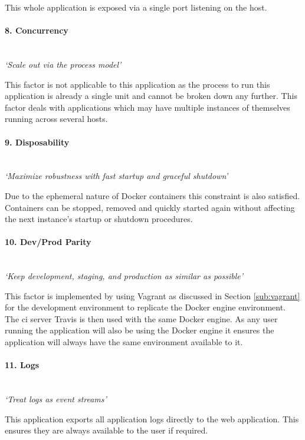 This whole application is exposed via a single port listening on the host.

\paragraph{8. Concurrency}\mbox{}\\
\textit{`Scale out via the process model'}

This factor is not applicable to this application as the process to run this application is already a single unit and cannot be broken down any further. This factor deals with applications which may have multiple instances of themselves running across several hosts.

\paragraph{9. Disposability}\mbox{}\\
\textit{`Maximize robustness with fast startup and graceful shutdown'}

Due to the ephemeral nature of \gls{Docker container}s this constraint is also satisfied. Containers can be stopped, removed and quickly started again without affecting the next instance's startup or shutdown procedures.

\paragraph{10. Dev/Prod Parity}\mbox{}\\
\textit{`Keep development, staging, and production as similar as possible'}

This factor is implemented by using Vagrant as discussed in Section \ref{sub:vagrant} for the development environment to replicate the Docker engine environment. The \gls{ci} server Travis is then used with the same Docker engine. As any user running the application will also be using the Docker engine it ensures the application will always have the same environment available to it.

\paragraph{11. Logs}\mbox{}\\
\textit{`Treat logs as event streams'}

This application exports all application logs directly to the web application. This ensures they are always available to the user if required.

